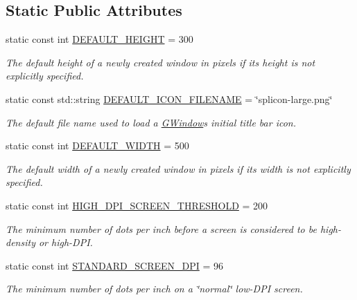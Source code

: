 \subsection*{Static Public Attributes}
\begin{DoxyCompactItemize}
\item 
static const int \mbox{\hyperlink{classGWindow_a2fab6d7a2bcb15d1595cacc38230f21b}{D\+E\+F\+A\+U\+L\+T\+\_\+\+H\+E\+I\+G\+HT}} = 300
\begin{DoxyCompactList}\small\item\em The default height of a newly created window in pixels if its height is not explicitly specified. \end{DoxyCompactList}\item 
static const std\+::string \mbox{\hyperlink{classGWindow_a666fcf3a55503322fbfd6314c4846542}{D\+E\+F\+A\+U\+L\+T\+\_\+\+I\+C\+O\+N\+\_\+\+F\+I\+L\+E\+N\+A\+ME}} = \char`\"{}splicon-\/large.\+png\char`\"{}
\begin{DoxyCompactList}\small\item\em The default file name used to load a \mbox{\hyperlink{classGWindow}{G\+Window}}\textquotesingle{}s initial title bar icon. \end{DoxyCompactList}\item 
static const int \mbox{\hyperlink{classGWindow_af7b8fc8ce7f700c853cfbc36ee8cc474}{D\+E\+F\+A\+U\+L\+T\+\_\+\+W\+I\+D\+TH}} = 500
\begin{DoxyCompactList}\small\item\em The default width of a newly created window in pixels if its width is not explicitly specified. \end{DoxyCompactList}\item 
static const int \mbox{\hyperlink{classGWindow_a212e92d31b813ef25adbb902ffae3c6b}{H\+I\+G\+H\+\_\+\+D\+P\+I\+\_\+\+S\+C\+R\+E\+E\+N\+\_\+\+T\+H\+R\+E\+S\+H\+O\+LD}} = 200
\begin{DoxyCompactList}\small\item\em The minimum number of dots per inch before a screen is considered to be high-\/density or high-\/\+D\+PI. \end{DoxyCompactList}\item 
static const int \mbox{\hyperlink{classGWindow_a28d634f1a144a0f1aabf338f0be6afe2}{S\+T\+A\+N\+D\+A\+R\+D\+\_\+\+S\+C\+R\+E\+E\+N\+\_\+\+D\+PI}} = 96
\begin{DoxyCompactList}\small\item\em The minimum number of dots per inch on a \char`\"{}normal\char`\"{} low-\/\+D\+PI screen. \end{DoxyCompactList}\end{DoxyCompactItemize}
